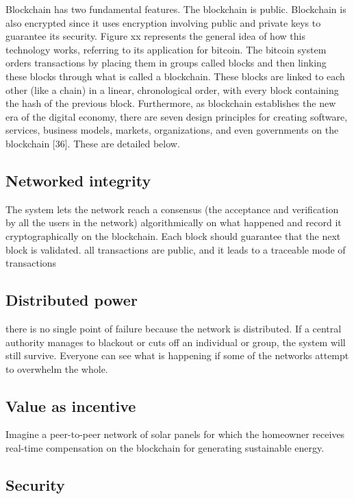   
  Blockchain has two fundamental features. The blockchain is public.  Blockchain is also encrypted since it uses encryption involving public and private keys to guarantee its security. Figure xx represents the general idea of how this technology works, referring to its application for bitcoin. The bitcoin system orders transactions by placing them in groups called blocks and then linking these blocks through what is called a blockchain. These blocks are linked to each other (like a chain) in a linear, chronological order, with every block containing the hash of the previous block. Furthermore, as blockchain establishes the new era of the digital economy, there are seven design principles for creating software, services, business models, markets, organizations, and even governments on the blockchain [36]. These are detailed below. 

  \subsection{Networked integrity}

  The system lets the network reach a consensus (the acceptance and verification by all the users in the network) algorithmically on what happened and record it cryptographically on the blockchain.  Each block should guarantee that the next block is validated. all transactions are public, and it leads to a traceable mode of transactions

  \subsection{Distributed power}

  there is no single point of failure because the network is distributed. If a central authority manages to blackout or cuts off an individual or group, the system will still survive. Everyone can see what is happening if some of the networks attempt to overwhelm the whole.

  \subsection{Value as incentive}

  Imagine a peer-to-peer network of solar panels for which the homeowner receives real-time compensation on the blockchain for generating sustainable energy.

  \subsection{Security}

